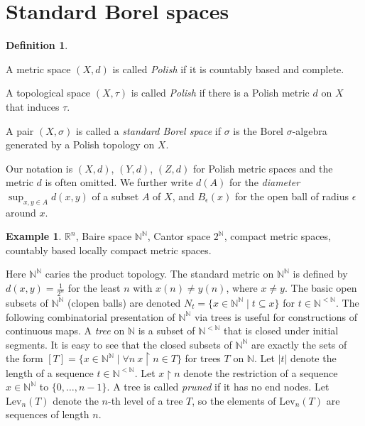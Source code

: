 \documentclass[10pt]{amsart}
\newcommand{\spl}{\mathrm{split}}
\newcommand{\RR}{\mathbb{R}}
\newcommand{\NN}{\mathbb{N}}
\newcommand{\Lev}{\mathrm{Lev}}
\theoremstyle{definition}
\newtheorem{definition}[theorem]{Definition}
\newtheorem{example}[theorem]{Example}
\theoremstyle{remark}
\newenvironment{enumerate-(a)}{\begin{enumerate}[label={\upshape (\alph*)}, leftmargin=2pc]}{\end{enumerate}}
\begin{document}
\section{Standard Borel spaces} 

\begin{definition} 
\begin{enumerate-(a)} 
\item 
A metric space $(X,d)$ is called \emph{Polish} if it is countably based and complete. 
\item 
A topological space $(X,\tau)$ is called \emph{Polish} if there is a Polish metric $d$ on $X$ that induces $\tau$. 
\item 
A pair $(X,\sigma)$ is called a \emph{standard Borel space} if $\sigma$ is the Borel $\sigma$-algebra generated by a Polish topology on $X$.  
\end{enumerate-(a)} 
\end{definition} 

Our notation is $(X,d)$, $(Y,d)$, $(Z,d)$ for Polish metric spaces and the metric $d$ is often omitted. 
We further write $d(A)$ for the \emph{diameter} $\sup_{x,y\in A} d(x,y)$ of a subset $A$ of $X$, and $B_\epsilon(x)$ for the open ball of radius $\epsilon$ around $x$. 

\begin{example} 
$\RR^n$, Baire space $\NN^\NN$,  Cantor space $2^\NN$, compact metric spaces, countably based locally compact metric spaces. 
\end{example} 

Here $\NN^\NN$ caries the product topology. 
The standard metric on $\NN^\NN$ is defined by $d(x,y)=\frac{1}{2^n}$ for the least $n$ with $x(n)\neq y(n)$, where $x\neq y$. 
The basic open subsets of $\NN^\NN$ (clopen balls) are denoted $N_t=\{x\in \NN^\NN\mid t\subseteq x\}$ for $t\in \NN^{<\NN}$. 
The following combinatorial presentation of $\NN^\NN$ via trees is useful for constructions of continuous maps. 
A \emph{tree} on $\NN$ is a subset of $\NN^{<\NN}$ that is closed under initial segments. 
It is easy to see that the closed subsets of $\NN^\NN$ are exactly the sets of the form $[T]=\{x\in \NN^\NN\mid \forall n\ x{\upharpoonright}n \in T\}$ for trees $T$ on $\NN$. 
Let $|t|$ denote the length of a sequence $t\in \NN^{<\NN}$. 
Let $x{\upharpoonright}n$ denote the restriction of a sequence $x\in \NN^\NN$ to $\{0,\dots,n-1\}$. 
A tree is called \emph{pruned} if it has no end nodes. 
Let $\Lev_n(T)$ denote the $n$-th level of a tree $T$, so the elements of $\Lev_n(T)$ are sequences of length $n$. 
\end{document}

